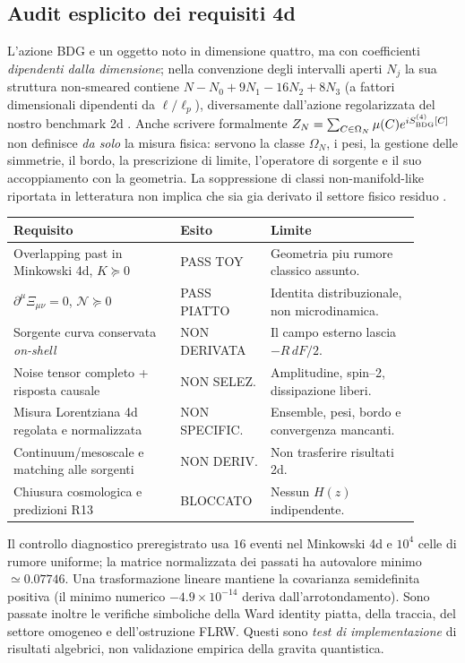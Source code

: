 \documentclass[11pt,a4paper]{article}
\newcommand{\status}[1]{\textsf{#1}}
\begin{document}
\subsection{Audit esplicito dei requisiti 4d}

L'azione BDG e un oggetto noto in dimensione quattro, ma con coefficienti \emph{dipendenti dalla dimensione}; nella convenzione degli intervalli aperti $N_j$ la sua struttura non-smeared contiene $N-N_0+9N_1-16N_2+8N_3$ (a fattori dimensionali dipendenti da $\ell/\ell_p$), diversamente dall'azione regolarizzata del nostro benchmark 2d \cite{BenincasaDowker2010,Carlip2024}. Anche scrivere formalmente $Z_N=\sum_{C\in\Omega_N}\mu(C)e^{iS^{(4)}_{\rm BDG}[C]}$ non definisce \emph{da solo} la misura fisica: servono la classe $\Omega_N$, i pesi, la gestione delle simmetrie, il bordo, la prescrizione di limite, l'operatore di sorgente e il suo accoppiamento con la geometria. La soppressione di classi non-manifold-like riportata in letteratura non implica che sia gia derivato il settore fisico residuo \cite{Carlip2024}.

\begin{center}
\small
\begin{tabular}{p{0.38\linewidth}p{0.18\linewidth}p{0.34\linewidth}}
\toprule
\textbf{Requisito} & \textbf{Esito} & \textbf{Limite}\tabularnewline\midrule
Overlapping past in Minkowski 4d, $K\succeq0$ & \status{PASS TOY} & Geometria piu rumore classico assunto.\\
$\partial^\mu\Xi_{\mu\nu}=0$, $\mathcal N\succeq0$ & \status{PASS PIATTO} & Identita distribuzionale, non microdinamica.\\
Sorgente curva conservata \emph{on-shell} & \status{NON DERIVATA} & Il campo esterno lascia $-R\,dF/2$.\\
Noise tensor completo + risposta causale & \status{NON SELEZ.} & Amplitudine, spin--2, dissipazione liberi.\\
Misura Lorentziana 4d regolata e normalizzata & \status{NON SPECIFIC.} & Ensemble, pesi, bordo e convergenza mancanti.\\
Continuum/mesoscale e matching alle sorgenti & \status{NON DERIV.} & Non trasferire risultati 2d.\\
Chiusura cosmologica e predizioni R13 & \status{BLOCCATO} & Nessun $H(z)$ indipendente.\\
\bottomrule
\end{tabular}
\end{center}

Il controllo diagnostico preregistrato usa $16$ eventi nel Minkowski 4d e $10^4$ celle di rumore uniforme; la matrice normalizzata dei passati ha autovalore minimo $\simeq0.07746$. Una trasformazione lineare mantiene la covarianza semidefinita positiva (il minimo numerico $-4.9\times10^{-14}$ deriva dall'arrotondamento). Sono passate inoltre le verifiche simboliche della Ward identity piatta, della traccia, del settore omogeneo e dell'ostruzione FLRW. Questi sono \emph{test di implementazione} di risultati algebrici, non validazione empirica della gravita quantistica.
\end{document}
